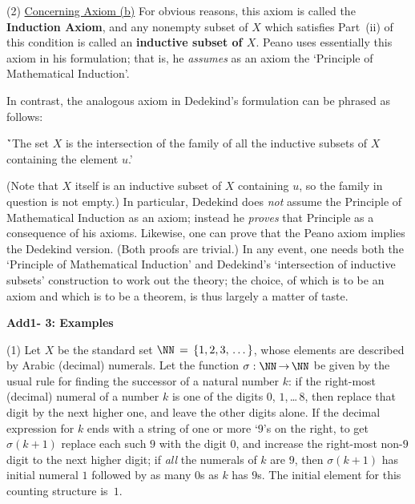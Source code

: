 \V

        (2) \underline{Concerning Axiom (b)} For obvious reasons, this axiom is called the {\bf Induction Axiom},
    and any nonempty subset of $X$ which satisfies Part~(ii) of this condition is called an {\bf inductive subset of $X$}.
    Peano uses essentially this axiom in his formulation; that is, he {\em assumes} as an axiom the `Principle of Mathematical Induction'.

        In contrast, the analogous axiom in Dedekind's formulation can be phrased as follows:

        \h `The set $X$ is the intersection of the family of all the inductive subsets of $X$ containing the element $u$.'

\noindent (Note that $X$ itself is an inductive subset of $X$ containing $u$, so the family in question is not empty.)
    In particular, Dedekind does {\em not} assume the Principle of Mathematical Induction as an axiom;
    instead he {\em proves} that Principle as a consequence of his axioms.
    Likewise, one can prove that the Peano axiom implies the Dedekind version. (Both proofs are trivial.)
    In any event, one needs both the `Principle of Mathematical Induction' and Dedekind's `intersection of inductive subsets' construction to work out the theory;
    the choice, of which is to be an axiom and which is to be a theorem, is thus largely a matter of taste.

\V
\V

        {\bf Add1- 3: Examples}

\V

        (1) Let $X$ be the standard set ${\NN} \,=\, \{1,2,3,\,{\ldots}\,\}$, whose elements are described by Arabic (decimal) numerals.
    Let the function ${\sigma}:{\NN} \,{\rightarrow}\, {\NN}$ be given by the usual rule for finding the successor of a natural number $k$:
    if the right-most (decimal) numeral of a number $k$ is one of the digits $0$, $1$,\,{\ldots}\,$8$, then replace that digit by the next higher one,
    and leave the other digits alone.
    If the decimal expression for $k$ ends with a string of one or more `$9$'s on the right, to get ${\sigma}(k+1)$ replace each such $9$ with the digit $0$,
    and increase the right-most non-$9$ digit to the next higher digit; if {\em all} the numerals of $k$ are $9$,
    then ${\sigma}(k+1)$ has initial numeral $1$ followed by as many $0$s as $k$ has $9$s.
    The initial element for this counting structure is~$1$.

